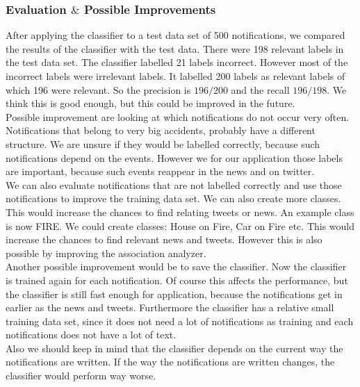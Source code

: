 \subsubsection*{Evaluation $\&$ Possible Improvements }
After applying the classifier to a test data set of 500 notifications, we compared the results of the classifier with the test data. 
There were 198 relevant labels in the test data set. The classifier labelled 21 labels incorrect. 
However most of the incorrect labels were irrelevant labels. 
It labelled 200 labels as relevant labels of which 196 were relevant. 
So the precision is $196/200$ and the recall $196/198$. 
We think this is good enough, but this could be improved in the future. \\
Possible improvement are looking at which notifications do not occur very often. 
Notifications that belong to very big accidents, probably have a different structure. 
We are unsure if they would be labelled correctly, because such notifications depend on the events. 
However we for our application those labels are important, because such events reappear in the news and on twitter. \\
We can also evaluate notifications that are not labelled correctly and use those notifications to improve the training data set. 
We can also create more classes. This would increase the chances to find relating tweets or news. An example class is now FIRE.
 We could create classes: House on Fire, Car on Fire etc. This would increase the chances to find relevant news and tweets. However this is also possible by improving the association analyzer. \\
 Another possible improvement would be to save the classifier. Now the classifier is trained again for each notification. 
 Of course this affects the performance, but the classifier is still fast enough for application, because the notifications get in earlier as the news and tweets. 
 Furthermore the classifier has a relative small training data set, since it does not need a lot of notifications as training and each notifications does not have a lot of text.\\
Also we should keep in mind that the classifier depends on the current way the notifications are written. 
If the way the notifications are written changes, the classifier would perform way worse.
